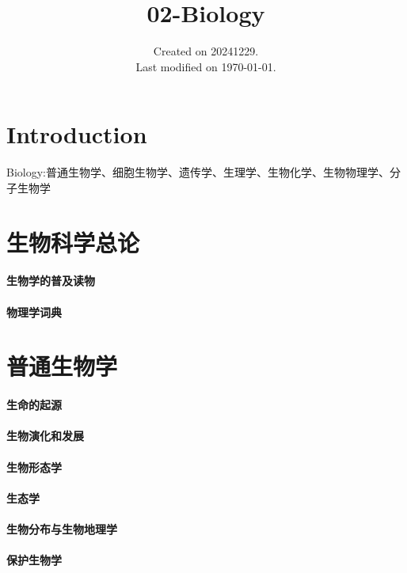 \documentclass[UTF8]{../NatureUniverse}
\begin{document}
\title{02-Biology}
\date{Created on 20241229.\\   Last modified on \today.}
\maketitle
\tableofcontents

\chapter{Introduction}

Biology:普通生物学、细胞生物学、遗传学、生理学、生物化学、生物物理学、分子生物学




\chapter{生物科学总论}
\subsubsection{生物学的普及读物}
\subsubsection{物理学词典}


\chapter{普通生物学}
\subsubsection{生命的起源}
\subsubsection{生物演化和发展}
\subsubsection{生物形态学}
\subsubsection{生态学}
\subsubsection{生物分布与生物地理学}
\subsubsection{保护生物学}
\end{document}
